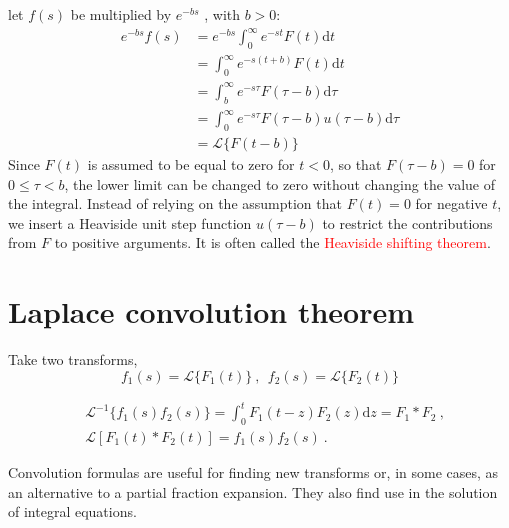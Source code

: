\documentclass[12pt,a4paper]{article}
\newcommand{\dif}{\mathrm{d}}
\newcounter{theo}[section]\setcounter{theo}{0}
\begin{document}
let $f(s)$ be multiplied by $e^{-bs}$ , with $b > 0$:
\begin{align}
\nonumber e^{-bs} f(s) &= e^{-bs} \int_0^\infty e^{-st} F(t) \dif t  \\
\nonumber & = \int_0^\infty e^{-s(t+b)} F(t) \dif t \\
\nonumber &= \int_b^\infty e^{-s\tau} F(\tau -b) \dif \tau \\
\nonumber &= \int_0^\infty e^{-s\tau} F(\tau -b) u(\tau -b) \dif \tau \\
\nonumber &= \mathcal L\{F(t-b) \}
\end{align}
Since $F(t)$ is assumed to be equal to zero for $t <0$, so that $F(\tau -b)=0$ for $0 \leqslant \tau < b$, the lower limit can be changed to zero without changing the value of the integral. Instead of relying on the assumption that $F (t ) = 0$ for negative $t$, we insert a Heaviside unit step function $u(\tau-b)$ to restrict the contributions from $F$ to positive arguments. It is often called the \textcolor{red}{Heaviside shifting theorem}.


\section{Laplace convolution theorem}
Take two transforms,
\begin{equation*}
f_1(s) = \mathcal L\{F_1(t) \} ~, ~~  f_2(s) = \mathcal L\{F_2(t) \}
\end{equation*}



\begin{align}
& \mathcal L^{-1} \{f_1(s) f_2(s)\} = \int_0^t F_1(t -z) F_2(z) \dif z = F_1 \ast F_2 ~, \\
& \mathcal L[F_1(t) \ast F_2(t)] = f_1(s) f_2(s) ~.
\end{align}

Convolution formulas are useful for finding new transforms or, in some cases, as an alternative to a partial fraction expansion. They also find use in the solution of integral equations.
\end{document}
